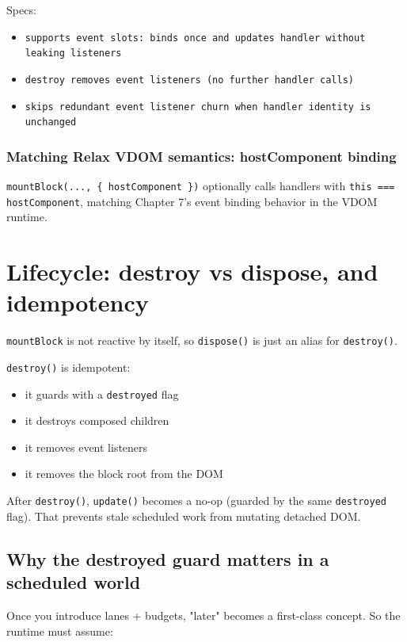 Specs:

\begin{itemize}
  \item \texttt{supports event slots: binds once and updates handler without leaking listeners}
  \item \texttt{destroy removes event listeners (no further handler calls)}
  \item \texttt{skips redundant event listener churn when handler identity is unchanged}
\end{itemize}

\subsubsection{Matching Relax VDOM semantics: hostComponent binding}

\texttt{mountBlock(..., \{ hostComponent \})} optionally calls handlers with \texttt{this === hostComponent}, matching Chapter 7’s event binding behavior in the VDOM runtime.

\section{Lifecycle: destroy vs dispose, and idempotency}

\texttt{mountBlock} is not reactive by itself, so \texttt{dispose()} is just an alias for \texttt{destroy()}.

\texttt{destroy()} is idempotent:

\begin{itemize}
  \item it guards with a \texttt{destroyed} flag
  \item it destroys composed children
  \item it removes event listeners
  \item it removes the block root from the DOM
\end{itemize}

After \texttt{destroy()}, \texttt{update()} becomes a no-op (guarded by the same \texttt{destroyed} flag). That prevents stale scheduled work from mutating detached DOM.

\subsection{Why the destroyed guard matters in a scheduled world}

Once you introduce lanes + budgets, "later" becomes a first-class concept.
So the runtime must assume:

